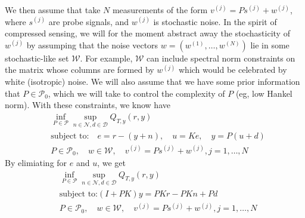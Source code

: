 \documentclass[11pt]{article} %
\newcommand{\calW}{\mathcal{W}}
\newcommand{\calD}{\mathcal{D}}
\newcommand{\calN}{\mathcal{N}}
\newcommand{\calP}{\mathcal{P}}
\theoremstyle{plain}
\theoremstyle{definition}
\theoremstyle{remark}
\begin{document}
We then assume that take $N$ measurements of the form $v^{(j)} = Ps^{(j)} + w^{(j)}$, where $s^{(j)}$ are probe signals, and $w^{(j)}$ is stochastic noise. In the spirit of compressed sensing, we will for the moment abstract away the stochasticity of $w^{(j)}$ by assumping that the noise vectors $w = (w^{(1)},\dots,w^{(N)})$ lie in some stochastic-like set $\calW$. For example, $\calW$ can include spectral norm constraints on the matrix whose columns are formed by $w^{(j)}$ which would be celebrated by white (isotropic) noise. We will also assume that we have some prior information that $P \in \calP_0$, which we will take to control the complexity of $P$ (eg, low Hankel norm). With these constraints, we know have
\begin{equation}\label{OPT2}
\begin{aligned}
&\inf_{P \in \calP} \sup_{n \in \calN,d \in \calD} Q_{T,y}(r,y)  \\
&\text{subject to:} \quad e = r - (y+n), \quad u = Ke,\quad  y = P(u+d)\\
& P \in \calP_0, \quad w \in \calW, \quad v^{(j)} = Ps^{(j)} + w^{(j)}, j = 1,\dots,N
\end{aligned}
\end{equation}
By elimiating for $e$ and $u$, we get
\begin{equation}\label{OPT3}
\begin{aligned}
&\inf_{P \in \calP} \sup_{n \in \calN,d \in \calD} Q_{T,y}(r,y)  \\
&\text{subject to:}   (I+PK)y = PKr - PKn + Pd\\
& P \in \calP_0, \quad w \in \calW, \quad v^{(j)} = Ps^{(j)} + w^{(j)}, j = 1,\dots,N
\end{aligned}
\end{equation}
\end{document}
